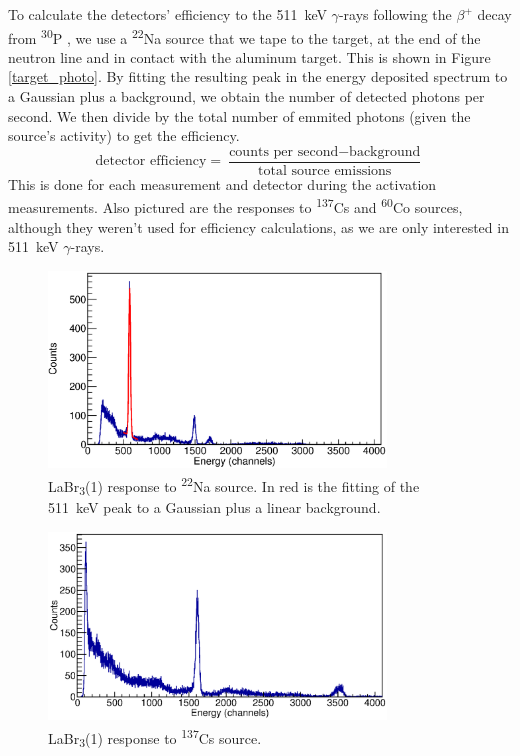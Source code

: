 \documentclass[a4paper,12pt]{report}
\newcommand{\Piso}{\textsuperscript{30}P }
\newcommand{\Na}{\textsuperscript{22}Na }
\begin{document}
To calculate the detectors' efficiency to the \qty{511}{\keV} $\gamma$-rays following the $\beta^+$ decay from \Piso, we use a \Na source that we tape to the target, at the end of the neutron line and in contact with the aluminum target.
This is shown in Figure \ref{target_photo}.
By fitting the resulting peak in the energy deposited spectrum to a Gaussian plus a background, we obtain the number of detected photons per second.
We then divide by the total number of emmited photons (given the source's activity) to get the efficiency.
\begin{equation}
	\text{detector efficiency} = \frac{\text{counts per second}-\text{background}}{\text{total source emissions}}
\end{equation}
This is done for each measurement and detector during the activation measurements.
Also pictured are the responses to \textsuperscript{137}Cs and \textsuperscript{60}Co sources, although they weren't used for efficiency calculations, as we are only interested in \qty{511}{\keV} $\gamma$-rays.

\begin{figure}[H]
	\centering
	\includegraphics[width=0.80\textwidth]{labr_na22_calibration.eps}
	\caption{LaBr\textsubscript{3}(1) response to \Na source. In red is the fitting of the \qty{511}{\keV} peak to a Gaussian plus a linear background.}
	\label{labr_na22_calibration}
\end{figure}

\begin{figure}[H]
	\centering
	\includegraphics[width=0.80\textwidth]{labr_cs137_calibration.eps}
	\caption{LaBr\textsubscript{3}(1) response to \textsuperscript{137}Cs source.}
	\label{labr_cs137_calibration}
\end{figure}
\end{document}
